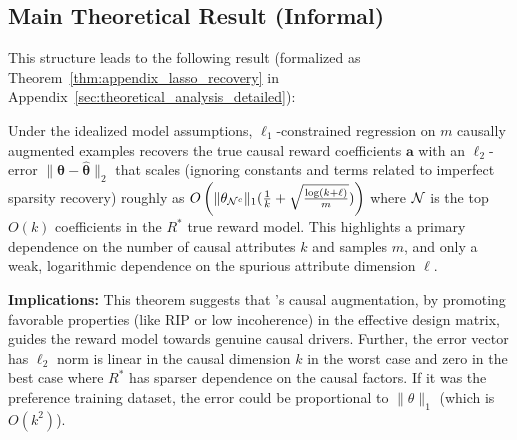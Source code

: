 \subsection{Main Theoretical Result (Informal)}

This structure leads to the following result (formalized as Theorem~\ref{thm:appendix_lasso_recovery} in Appendix~\ref{sec:theoretical_analysis_detailed}):

\vspace{0.03in}
\begin{takeawaybox}
\vspace{-0.1in}
\begin{theorem}
\label{thm:main_body_lasso_recovery}
Under the idealized model assumptions, $\ell_1$-constrained regression on $m$ causally augmented examples recovers the true causal reward coefficients  $\mathbf{a}$ with an $\ell_2$-error $\lVert \mathbf{\theta} - \hat{\mathbf{\theta}} \rVert_2$ that scales (ignoring constants and terms related to imperfect sparsity recovery) roughly as $O\left( \lVert \theta_{{\cal N}^c}\rVert_ 1 (\frac{1}{k} + \sqrt{\frac{\log(k+\ell)}{m}})\right)$ where ${\cal N}$ is the top $O(k)$ coefficients in the $R^{*}$ true reward model. This highlights a primary dependence on the number of causal attributes $k$ and samples $m$, and only a weak, logarithmic dependence on the spurious attribute dimension $\ell$.
\end{theorem}
\end{takeawaybox}

\vspace{0.03in}

\textbf{Implications:} This theorem suggests that \carma{}'s causal augmentation, by promoting favorable properties (like RIP or low incoherence) in the effective design matrix, guides the reward model towards genuine causal drivers. Further, the error vector has $\ell_2$ norm is linear in the causal dimension $k$ in the worst case and zero in the best case where $R^{*}$ has sparser dependence on the causal factors.  If it was the preference training dataset, the error could be proportional to $\lVert \theta \rVert_1$ (which is $O(k^2)$).
